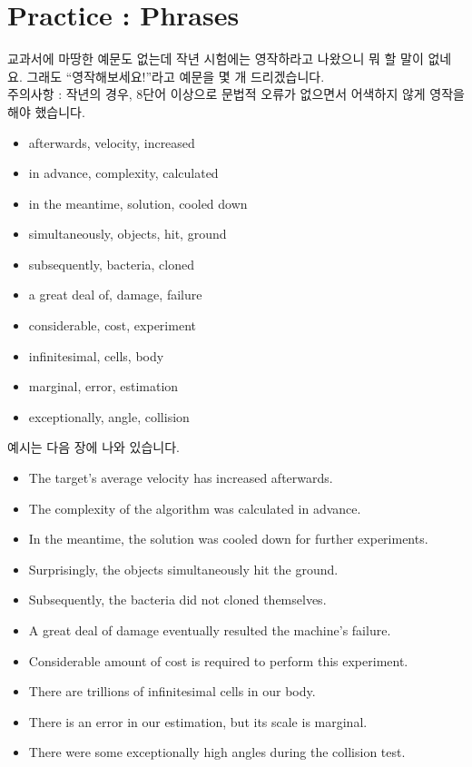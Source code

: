 \documentclass[10pt]{report}
\begin{document}
	\chapter{Practice : Phrases}\label{practice_phrases}
	교과서에 마땅한 예문도 없는데 작년 시험에는 영작하라고 나왔으니 뭐 할 말이 없네요. 그래도 ``영작해보세요!''라고 예문을 몇 개 드리겠습니다. \\
	주의사항 : 작년의 경우, 8단어 이상으로 문법적 오류가 없으면서 어색하지 않게 영작을 해야 했습니다.
	\begin{itemize}
		\item afterwards, velocity, increased
		\item in advance, complexity, calculated
		\item in the meantime, solution, cooled down
		\item simultaneously, objects, hit, ground
		\item subsequently, bacteria, cloned
		\item a great deal of, damage, failure
		\item considerable, cost, experiment
		\item infinitesimal, cells, body
		\item marginal, error, estimation
		\item exceptionally, angle, collision
	\end{itemize}
	예시는 다음 장에 나와 있습니다.
	\newpage
	\begin{itemize}
		\item The target's average velocity has increased afterwards.
		\item The complexity of the algorithm was calculated in advance.
		\item In the meantime, the solution was cooled down for further experiments.
		\item Surprisingly, the objects simultaneously hit the ground.
		\item Subsequently, the bacteria did not cloned themselves.
		\item A great deal of damage eventually resulted the machine's failure.
		\item Considerable amount of cost is required to perform this experiment.
		\item There are trillions of infinitesimal cells in our body.
		\item There is an error in our estimation, but its scale is marginal.
		\item There were some exceptionally high angles during the collision test.
	\end{itemize}
	
\end{document}
